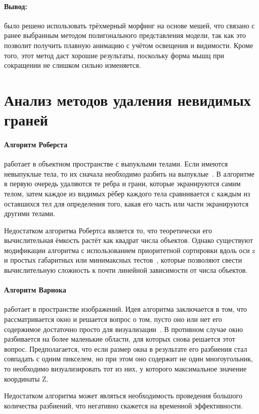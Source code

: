 \paragraph{Вывод:} было решено использовать трёхмерный морфинг на основе мешей, что связано с ранее выбранным методом полигонального представления модели, так как это позволит получить плавную анимацию с учётом освещения и видимости. Кроме того, этот метод даст хорошие результаты, поскольку форма мышц при сокращении не слишком сильно изменяется.

\section{Анализ методов удаления невидимых граней}
\label{sec:inv_edge}

\paragraph{Алгоритм Роберста} работает в объектном пространстве с выпуклыми телами. Если имеются невыпуклые тела, то их сначала необходимо разбить на выпуклые~\cite{rogers}. В алгоритме в первую очередь удаляются те ребра и грани, которые экранируются самим телом, затем каждое из видимых рёбер каждого тела сравнивается с каждым из оставшихся тел для определения того, какая его часть или части экранируются другими телами.
\par Недостатком алгоритма Робертса является то, что теоретически его вычислительная ёмкость растёт как квадрат числа объектов. Однако существуют модификации алгоритма с использованием приоритетной сортировки вдоль оси z и простых габаритных или минимаксных тестов~\cite{rogers}, которые позволяют свести вычислительную сложность к почти линейной зависимости от числа объектов.

\paragraph{Алгоритм Варнока} работает в пространстве изображений. Идея алгоритма заключается в том, что рассматривается окно и решается вопрос о том, пусто оно или нет его содержимое достаточно просто для визуализации~\cite{rogers}. В противном случае окно разбивается на более маленькие области, для которых снова решается этот вопрос. Предполагается, что если размер окна в результате его разбиения стал совпадать с одним пикселем, но при этом оно содержит не один многоугольник, то необходимо визуализировать тот из них, у которого максимальное значение координаты Z.
\par Недостатком алгоритма может являться необходимость проведения большого количества разбиений, что негативно скажется на временной эффективности.


